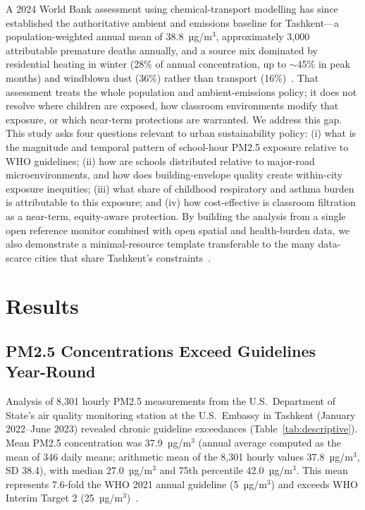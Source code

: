 \documentclass[11pt,a4paper]{article}
\begin{document}
A 2024 World Bank assessment using chemical-transport modelling has since established the authoritative ambient and emissions baseline for Tashkent---a population-weighted annual mean of 38.8~µg/m$^3$, approximately 3,000 attributable premature deaths annually, and a source mix dominated by residential heating in winter (28\% of annual concentration, up to $\sim$45\% in peak months) and windblown dust (36\%) rather than transport (16\%)~\cite{worldbank2024tashkent}. That assessment treats the whole population and ambient-emissions policy; it does not resolve where children are exposed, how classroom environments modify that exposure, or which near-term protections are warranted. We address this gap. This study asks four questions relevant to urban sustainability policy: (i) what is the magnitude and temporal pattern of school-hour PM2.5 exposure relative to WHO guidelines; (ii) how are schools distributed relative to major-road microenvironments, and how does building-envelope quality create within-city exposure inequities; (iii) what share of childhood respiratory and asthma burden is attributable to this exposure; and (iv) how cost-effective is classroom filtration as a near-term, equity-aware protection. By building the analysis from a single open reference monitor combined with open spatial and health-burden data, we also demonstrate a minimal-resource template transferable to the many data-scarce cities that share Tashkent's constraints~\cite{worldbank2024dialogue}.

\section{Results}

\subsection{PM2.5 Concentrations Exceed Guidelines Year-Round}

Analysis of 8,301 hourly PM2.5 measurements from the U.S.\ Department of State's air quality monitoring station at the U.S.\ Embassy in Tashkent (January 2022--June 2023) revealed chronic guideline exceedances (Table~\ref{tab:descriptive}). Mean PM2.5 concentration was 37.9~µg/m$^3$ (annual average computed as the mean of 346 daily means; arithmetic mean of the 8,301 hourly values 37.8~µg/m$^3$, SD 38.4), with median 27.0~µg/m$^3$ and 75th percentile 42.0~µg/m$^3$. This mean represents 7.6-fold the WHO 2021 annual guideline (5~µg/m$^3$) and exceeds WHO Interim Target 2 (25~µg/m$^3$)~\cite{who2021guidelines}.
\end{document}
